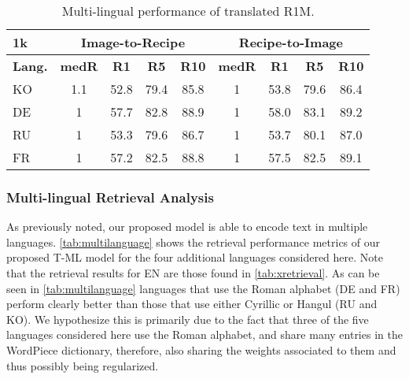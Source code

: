 \documentclass[sigconf,nonacm]{acmart}
\begin{document}
\begin{table}[!ht]
  \centering
  \small
  \caption{Multi-lingual performance 
of translated R1M.}
  \begin{tabular}{l|cccc|cccc}
\toprule
	\textbf{1k} & \multicolumn{4}{c|}{\textbf{Image-to-Recipe}} & \multicolumn{4}{c}{\textbf{Recipe-to-Image}}  \\ \hline
	\textbf{Lang.} & \textbf{medR} & \textbf{R1} & \textbf{R5} & \textbf{R10} & \textbf{medR} & \textbf{R1} & \textbf{R5} & \textbf{R10}  \\ 
	\midrule
	KO & 1.1 & 52.8 & 79.4 & 85.8 & 1 & 53.8 & 79.6 & 86.4\\ 
	DE & 1 & 57.7 & 82.8 & 88.9 & 1 & 58.0 & 83.1 & 89.2 \\ 
	RU & 1 & 53.3 & 79.6 & 86.7 & 1 & 53.7 & 80.1 & 87.0 \\ 
	FR & 1 & 57.2 & 82.5 & 88.8 & 1 & 57.5 & 82.5 & 89.1 \\ 
	\bottomrule
     \end{tabular}\label{tab:multilanguage}\end{table}

\subsubsection{\textbf{Multi-lingual Retrieval Analysis}}

As previously noted, our proposed model is able to encode text in multiple languages. \autoref{tab:multilanguage} shows the retrieval performance metrics of our proposed T-ML model for the four additional languages considered here. Note that the retrieval results for EN are those found in \autoref{tab:xretrieval}. As can be seen in \autoref{tab:multilanguage} languages that use the Roman alphabet (DE and FR) perform clearly better than those that use either Cyrillic or Hangul (RU and KO). We hypothesize this is primarily due to the fact that three of the five languages considered here use the Roman alphabet, and share many entries in the WordPiece dictionary, therefore, also sharing the weights associated to them and thus possibly being regularized. 
\end{document}
